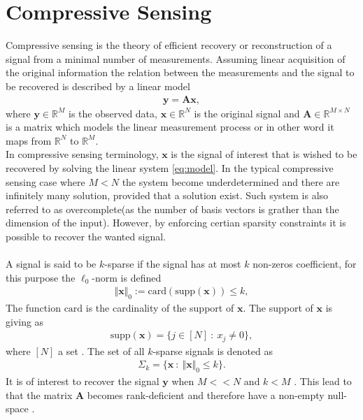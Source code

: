 \section{Compressive Sensing}\label{sec:CS}
Compressive sensing is the theory of efficient recovery or reconstruction of a signal from a minimal number of measurements. Assuming linear acquisition of the original information the relation between the measurements and the signal to be recovered is described by a linear model\cite{FR} 
\begin{align*}\label{eq:model}
\mathbf{y} = \mathbf{Ax},
\end{align*}
where $\mathbf{y} \in \mathbb{R}^M$ is the observed data, $\mathbf{x} \in \mathbb{R}^N$ is the original signal and $\mathbf{A} \in \mathbb{R}^{M \times N}$ is a matrix which models the linear measurement process or in other word it maps from $\mathbb{R}^{N}$ to $\mathbb{R}^{M}$.\\
In compressive sensing terminology, $\mathbf{x}$ is the signal of interest that is wished to be recovered by solving the linear system \eqref{eq:model}. In the typical compressive sensing case where $M<N$ the system become underdetermined and there are infinitely many solution, provided that a solution exist. Such system is also referred to as overcomplete(as the number of basis vectors is grather than the dimension of the input). However, by enforcing certian sparsity constraints it is possible to recover the wanted signal\cite{FR}.   
\\ \\
A signal is said to be $k$-sparse if the signal has at most $k$ non-zeros coefficient, for this purpose the $\ell_0$-norm is defined 
\begin{align*}
\Vert \mathbf{x} \Vert_0 := \text{card}(\text{supp}(\mathbf{x})) \leq k,
\end{align*}
The function $\text{card}$ is the cardinality of the support of $\mathbf{x}$. The support of $\mathbf{x}$ is giving as
\begin{align*}
\text{supp}(\mathbf{x}) = \{ j \in [N] \ : \ x_j \neq 0 \},
\end{align*} 
where $[N]$ a set \cite[p. 41]{FR}. The set of all $k$-sparse signals is denoted as
\begin{align*}
\Sigma_k = \{ \mathbf{x} \ : \ \Vert \mathbf{x} \Vert_0 \leq k \}.
\end{align*}
It is of interest to recover the signal $\mathbf{y}$ when $M << N$ and $k < M$ \cite[p. 8]{CS}. This lead to that the matrix $\mathbf{A}$ becomes rank-deficient and therefore have a non-empty null-space \cite[p. ix]{CS}.
